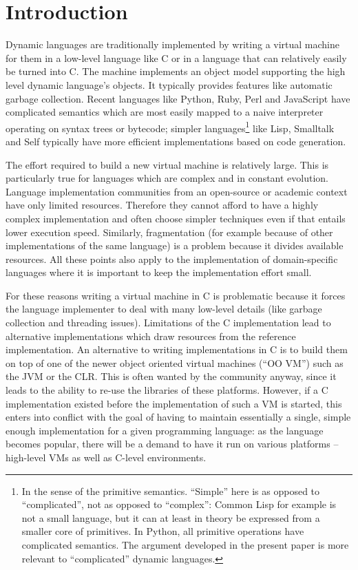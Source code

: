 \documentclass{llncs}
\begin{document}
\section{Introduction}

Dynamic languages are traditionally implemented by writing a virtual
machine for them in a low-level language like C or in a language that
can relatively easily be turned into C.  The machine implements an
object model supporting the high level dynamic language's objects.  It
typically provides features like automatic garbage collection.  Recent
languages like Python, Ruby, Perl and JavaScript have complicated
semantics which are most easily mapped to a naive interpreter operating
on syntax trees or bytecode; simpler languages\footnote
{
In the sense of the primitive semantics.  ``Simple'' here is
as opposed to ``complicated'', not as opposed to ``complex'': Common
Lisp for example is not a small language, but it can at least in theory
be expressed from a smaller core of primitives.  In Python, all
primitive operations have complicated semantics.  The argument developed
in the present paper is more relevant to ``complicated'' dynamic languages.
}
like Lisp, Smalltalk and Self typically have more
efficient implementations based on code generation.

The effort required to build a new virtual machine is relatively
large.  This is particularly true for languages which are complex
and in constant evolution. Language implementation communities from an
open-source or academic context have only limited resources. Therefore they
cannot afford to have a highly complex implementation and often choose simpler
techniques even if that entails lower execution speed. Similarly, fragmentation
(for example because of other implementations of the same language) is a
problem because it divides available resources. All these points also apply to
the implementation of domain-specific languages where it is important to keep
the implementation effort small.

For these reasons writing a virtual machine in C is problematic because it
forces the language implementer to deal with many low-level details (like
garbage collection and threading issues). Limitations
of the C implementation lead to alternative implementations which draw
resources from the reference implementation. An alternative to writing
implementations in C is to build them on top of one of the newer object oriented
virtual machines (``OO VM'') such as the JVM or the CLR. This is often wanted by
the community anyway, since it leads to the ability to re-use the libraries of
these platforms. However, if a C implementation existed before the
implementation of such a VM is started, this enters into conflict with the goal of
having to maintain essentially a single, simple enough implementation for a
given programming language: as the language becomes popular, there will be a
demand to have it run on various platforms -- high-level VMs as well as
C-level environments.
\end{document}
